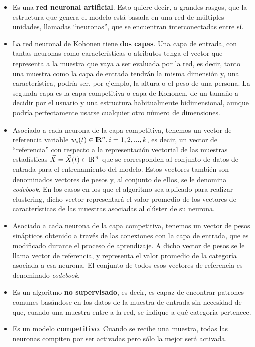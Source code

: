 \begin{itemize}
	\item Es una \textbf{red neuronal artificial}. Esto quiere decir, a grandes rasgos, que la estructura que genera el modelo está basada en una red de múltiples unidades, llamadas ``neuronas'', que se encuentran interconectadas entre sí.
	
	\item La red neuronal de Kohonen tiene \textbf{dos capas}. Una capa de entrada, con tantas neuronas como características o atributos tenga el vector que representa a la muestra que vaya a ser evaluada por la red, es decir, tanto una muestra como la capa de entrada tendrán la misma dimensión y, una característica, podría ser, por ejemplo, la altura o el peso de una persona. La segunda capa es la capa competitiva o capa de Kohonen, de un tamaño a decidir por el usuario y una estructura habitualmente bidimensional, aunque podría perfectamente usarse cualquier otro número de dimensiones.

	\item Asociado a cada neurona de la capa competitiva, tenemos un vector de referencia variable $w_i(t) \in {\rm I\!R}^n, i=1,2, ..., k$, es decir, un vector de ``referencia'' con respecto a la representación vectorial de las muestras estadísticas $\vec{X} = \vec{X}(t) \in {\rm I\!R}^n$ que se corresponden al conjunto de datos de entrada para el entrenamiento del modelo. Estos vectores también son denominados vectores de pesos y, al conjunto de ellos, se le denomina \textit{codebook}. En los casos en los que el algoritmo sea aplicado para realizar clustering, dicho vector representará el valor promedio de los vectores de características de las muestras asociadas al clúster de su neurona. 

	\item Asociado a cada neurona de la capa competitiva, tenemos un vector de pesos sinápticos obtenido a través de las conexiones con la capa de entrada, que es modificado durante el proceso de aprendizaje. A dicho vector de pesos se le llama vector de referencia, y representa el valor promedio de la categoría asociada a esa neurona. El conjunto de todos esos vectores de referencia es denominado \textit{codebook}.

	\item Es un algoritmo \textbf{no supervisado}, es decir, es capaz de encontrar patrones comunes basándose en los datos de la muestra de entrada sin necesidad de que, cuando una muestra entre a la red, se indique a qué categoría pertenece.

	\item Es un modelo \textbf{competitivo}. Cuando se recibe una muestra, todas las neuronas compiten por ser activadas pero sólo la mejor será activada.
\end{itemize}

